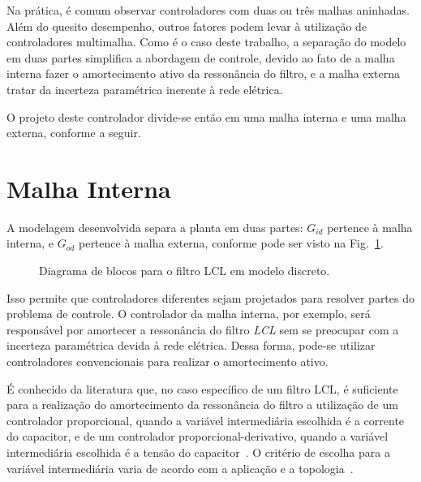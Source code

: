   Na prática, é comum observar controladores com duas ou três malhas aninhadas. Além do quesito desempenho, outros fatores podem levar à utilização de controladores multimalha. Como é o caso deste trabalho, a separação do modelo em duas partes simplifica a abordagem de controle, devido ao fato de a malha interna fazer o amortecimento ativo da ressonância do filtro, e a malha externa tratar da incerteza paramétrica inerente à rede elétrica.

  O projeto deste controlador divide-se então em uma malha interna e uma malha externa, conforme a seguir.

\section{Malha Interna}

  A modelagem desenvolvida separa a planta em duas partes: $G_{id}$ pertence à malha interna, e $G_{od}$ pertence à malha externa, conforme pode ser visto na Fig.~\ref{fig:LCL_discreto}.

  \begin{figure}[htb]
    \centering{
      \def\svgwidth{\textwidth}
      }
    \renewcommand\figurename{Fig.}
    \caption{Diagrama de blocos para o filtro LCL em modelo discreto.}
    \label{fig:LCL_discreto}
  \end{figure}

  Isso permite que controladores diferentes sejam projetados para resolver partes do problema de controle. O controlador da malha interna, por exemplo, será responsável por amortecer a ressonância do filtro \emph{LCL} sem se preocupar com a incerteza paramétrica devida à rede elétrica. Dessa forma, pode-se utilizar controladores convencionais para realizar o amortecimento ativo.

  É conhecido da literatura que, no caso específico de um filtro LCL, é suficiente para a realização do amortecimento da ressonância do filtro a utilização de um controlador proporcional, quando a variável intermediária escolhida é a corrente do capacitor, e de um controlador proporcional-derivativo, quando a variável intermediária escolhida é a tensão do capacitor~\cite{ref:DANNEHL}. O critério de escolha para a variável intermediária varia de acordo com a aplicação e a topologia~\cite{ref:POH}.

